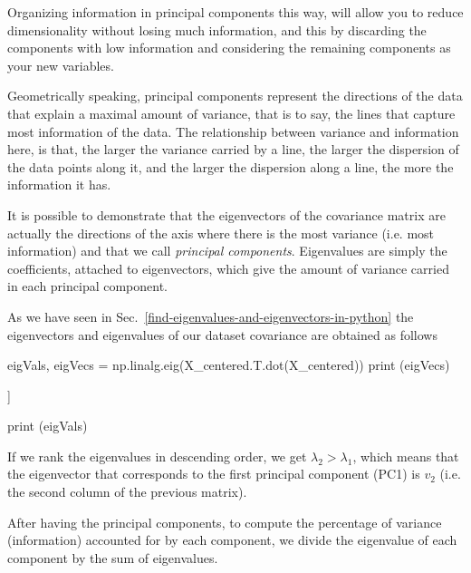 Organizing information in principal components this way, will allow you to reduce dimensionality without losing much information, and this by discarding the components with low information and considering the remaining components as your new variables.

Geometrically speaking, principal components represent the directions of the data that explain a maximal amount of variance, that is to say, the lines that capture most information of the data. The relationship between variance and information here, is that, the larger the variance carried by a line, the larger the dispersion of the data points along it, and the larger the dispersion along a line, the more the information it has.

It is possible to demonstrate that the eigenvectors of the covariance matrix are actually the directions of the axis where there is the most variance (i.e. most information) and that we call \emph{principal components}. Eigenvalues are simply the coefficients, attached to eigenvectors, which give the amount of variance carried in each principal component.

As we have seen in Sec.~\ref{find-eigenvalues-and-eigenvectors-in-python} the eigenvectors and eigenvalues of our dataset covariance are obtained as follows

\begin{ipython}
eigVals, eigVecs = np.linalg.eig(X_centered.T.dot(X_centered))
print (eigVecs)
\end{ipython}
\begin{ioutput}
[[-0.70710678 -0.70710678]
 [ 0.70710678 -0.70710678]]
\end{ioutput}

\begin{ipython}
print (eigVals)
\end{ipython}
\begin{ioutput}
[  7.46600865 192.53399135]
\end{ioutput}

If we rank the eigenvalues in descending order, we get $\lambda_2\gt\lambda_1$, which means that the eigenvector that corresponds to the first principal component (PC1) is  $v_2$ (i.e. the second column of the previous matrix).

After having the principal components, to compute the percentage of variance (information) accounted for by each component, we divide the eigenvalue of each component by the sum of eigenvalues. 

